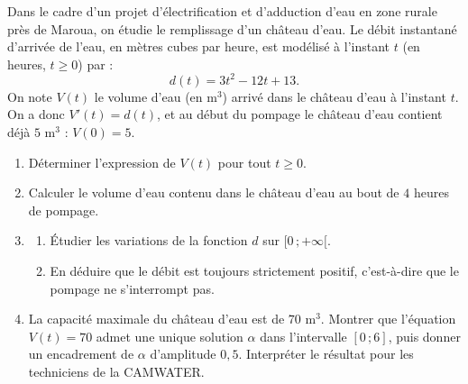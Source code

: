 \documentclass[11pt]{article}
\begin{document}
\begin{exercice}
Dans le cadre d'un projet d'électrification et d'adduction d'eau en zone rurale près de Maroua, on étudie le remplissage d'un château d'eau. Le débit instantané d'arrivée de l'eau, en mètres cubes par heure, est modélisé à l'instant $t$ (en heures, $t \geq 0$) par :
\[ d(t) = 3t^2 - 12t + 13. \]
On note $V(t)$ le volume d'eau (en m$^3$) arrivé dans le château d'eau à l'instant $t$. On a donc $V'(t) = d(t)$, et au début du pompage le château d'eau contient déjà $5$ m$^3$ : $V(0) = 5$.
\begin{enumerate}
\item Déterminer l'expression de $V(t)$ pour tout $t \geq 0$.
\item Calculer le volume d'eau contenu dans le château d'eau au bout de $4$ heures de pompage.
\item \begin{enumerate}
\item Étudier les variations de la fonction $d$ sur $[0\,;+\infty[$.
\item En déduire que le débit est toujours strictement positif, c'est-à-dire que le pompage ne s'interrompt pas.
\end{enumerate}
\item La capacité maximale du château d'eau est de $70$ m$^3$. Montrer que l'équation $V(t) = 70$ admet une unique solution $\alpha$ dans l'intervalle $[0\,;6]$, puis donner un encadrement de $\alpha$ d'amplitude $0{,}5$. Interpréter le résultat pour les techniciens de la CAMWATER.
\end{enumerate}
\end{exercice}
\end{document}
